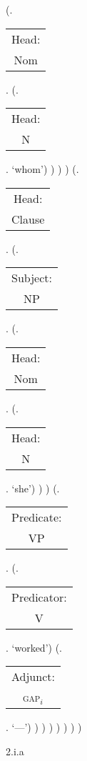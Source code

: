\documentclass[12pt,letterpaper]{article}
\begin{document}
\begin{figure}
\begin{center}
\begin{parsetree}
										(.\begin{tabular}{c}Head:\\Nom\end{tabular}.
											(.\begin{tabular}{c}Head:\\N\end{tabular}. `whom')
										)
									)
								)
								(.\begin{tabular}{c}Head:\\Clause\end{tabular}.
									(.\begin{tabular}{c}Subject:\\NP\end{tabular}.
										(.\begin{tabular}{c}Head:\\Nom\end{tabular}.
											(.\begin{tabular}{c}Head:\\N\end{tabular}. `she')
										)
									)
									(.\begin{tabular}{c}Predicate:\\VP\end{tabular}.
										(.\begin{tabular}{c}Predicator:\\V\end{tabular}. `worked')
									(.\begin{tabular}{c}Adjunct:\\\textsc{gap}$_i$\end{tabular}. `---')
									)
								)
							)
						)
					)
				)
			)
			
			\hfill \break\hfill \break
			\end{parsetree}
			2.i.a
		\end{center}
	\end{figure}
\end{document}
